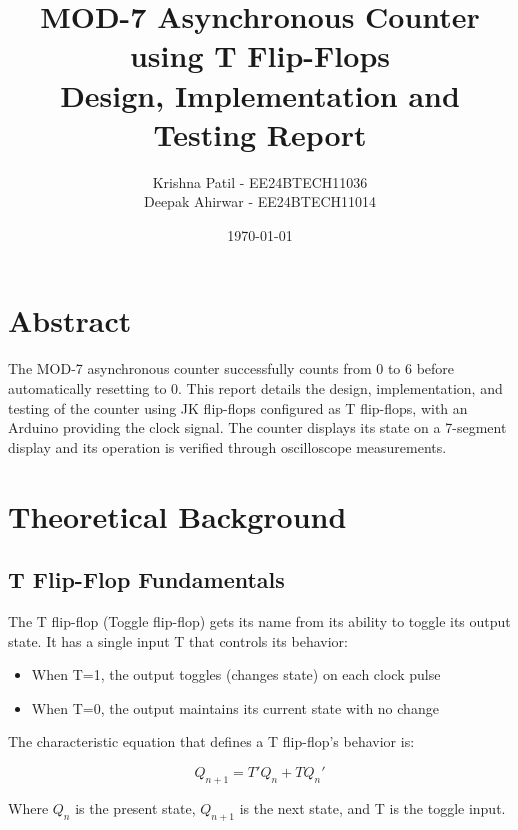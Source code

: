 \documentclass{article}
\title{
    \vspace{2cm}
    \textbf{MOD-7 Asynchronous Counter using T Flip-Flops} \\
    \large Design, Implementation and Testing Report
    \vspace{1cm}
}
\author{
   Krishna Patil - EE24BTECH11036 \\
   Deepak Ahirwar - EE24BTECH11014
}
\date{\today}
\begin{document}
\maketitle
\thispagestyle{empty}

\clearpage

\section*{Abstract}
\begin{tcolorbox}[colback=boxbg,colframe=titlebg,title=Abstract,breakable]
The MOD-7 asynchronous counter successfully counts from 0 to 6 before automatically resetting to 0. This report details the design, implementation, and testing of the counter using JK flip-flops configured as T flip-flops, with an Arduino providing the clock signal. The counter displays its state on a 7-segment display and its operation is verified through oscilloscope measurements.
\end{tcolorbox}

\tableofcontents

\section{Theoretical Background}
\subsection{T Flip-Flop Fundamentals}
\begin{tcolorbox}[colback=boxbg,colframe=titlebg,title=T Flip-Flop Fundamentals,breakable]
The T flip-flop (Toggle flip-flop) gets its name from its ability to toggle its output state. It has a single input T that controls its behavior:

\begin{itemize}
    \item When T=1, the output toggles (changes state) on each clock pulse
    \item When T=0, the output maintains its current state with no change
\end{itemize}

The characteristic equation that defines a T flip-flop's behavior is:

\begin{equation}
    Q_{n+1} = T'Q_n + TQ_n'
\end{equation}

Where $Q_n$ is the present state, $Q_{n+1}$ is the next state, and T is the toggle input.
\end{tcolorbox}
\end{document}
